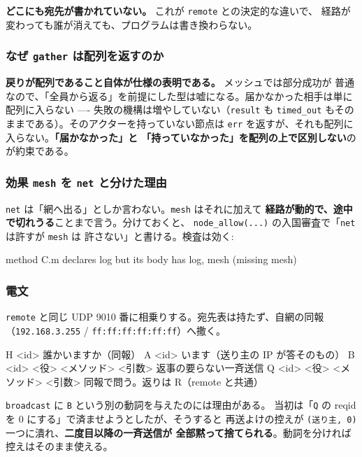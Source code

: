 \documentclass[11pt,a4paper]{ltjsarticle}
\begin{document}
\textbf{どこにも宛先が書かれていない。} これが \texttt{remote} との決定的な違いで、
経路が変わっても誰が消えても、プログラムは書き換わらない。

\subsubsection*{なぜ \texttt{gather} は配列を返すのか}

\textbf{戻りが配列であること自体が仕様の表明である。} メッシュでは部分成功が
普通なので、「全員から返る」を前提にした型は嘘になる。届かなかった相手は単に
配列に入らない ---- 失敗の機構は増やしていない（\texttt{result} も
\texttt{timed\_out} もそのままである）。そのアクターを持っていない節点は
\texttt{err} を返すが、それも配列に入らない。\textbf{「届かなかった」と
「持っていなかった」を配列の上で区別しない}のが約束である。

\subsubsection*{効果 \texttt{mesh} を \texttt{net} と分けた理由}

\texttt{net} は「網へ出る」としか言わない。\texttt{mesh} はそれに加えて
\textbf{経路が動的で、途中で切れうる}ことまで言う。分けておくと、
\texttt{node\_allow(...)} の入国審査で「\texttt{net} は許すが \texttt{mesh} は
許さない」と書ける。検査は効く:

\begin{term}
method C.m declares {log} but its body has {log, mesh} (missing {mesh})
\end{term}

\subsubsection*{電文}

\texttt{remote} と同じ UDP 9010 番に相乗りする。宛先表は持たず、自網の同報
（\texttt{192.168.3.255} / \texttt{ff:ff:ff:ff:ff:ff}）へ撒く。

\begin{term}
H <id>                        誰かいますか（同報）
A <id>                        います（送り主の IP が答そのもの）
B <id> <役> <メソッド> <引数>  返事の要らない一斉送信
Q <id> <役> <メソッド> <引数>  同報で問う。返りは R（remote と共通）
\end{term}

\texttt{broadcast} に \texttt{B} という別の動詞を与えたのには理由がある。
当初は「\texttt{Q} の reqid を 0 にする」で済ませようとしたが、そうすると
再送よけの控えが \texttt{(送り主, 0)} 一つに潰れ、\textbf{二度目以降の一斉送信が
全部黙って捨てられる}。動詞を分ければ控えはそのまま使える。
\end{document}
